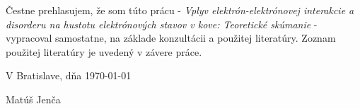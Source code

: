 \thispagestyle{empty}
\vskip 5cm
Čestne prehlasujem, že som túto prácu - {\it Vplyv elektrón-elektrónovej interakcie a disorderu na hustotu elektrónových
stavov v kove: Teoretické skúmanie} - vypracoval samostatne, na základe konzultácii a použitej literatúry.
Zoznam použitej literatúry je uvedený v závere práce.

\vskip 2cm
V Bratislave, dňa \today
\vskip 2cm

\begin{flushright}
Matúš Jenča
\end{flushright}
